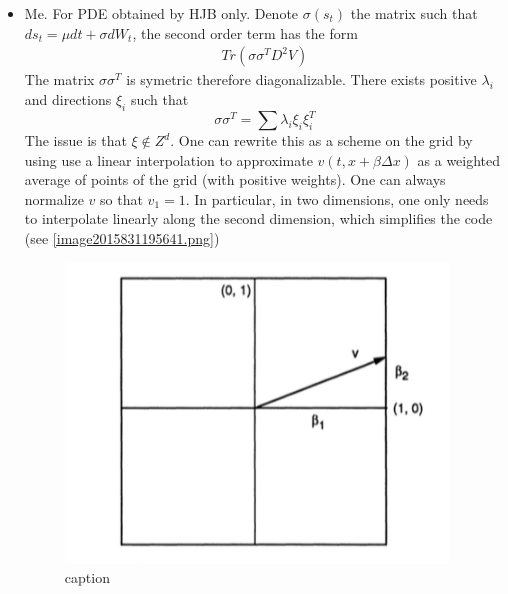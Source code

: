 \documentclass[english]{article}
\begin{document}
\begin{itemize}
\begin{itemize}
\begin{itemize}
			\item Me. For PDE obtained by HJB only. Denote $\sigma(s_t)$ the matrix such that $ds_t = \mu dt + \sigma dW_t$, the second order term has the form 
			\begin{align*}
				Tr(\sigma\sigma^TD^2V)
			\end{align*}
			The matrix $\sigma\sigma^T$ is symetric therefore diagonalizable. There exists positive $\lambda_i$ and directions $\xi_i$ such that
			$$\sigma\sigma^T = \sum \lambda_i \xi_i \xi_i^T$$ 
			The issue is that $\xi \notin Z^d$. One can rewrite this as a scheme on the grid by using use a linear interpolation to approximate $v(t, x+\beta \Delta x) $ as a weighted average of points of the grid (with positive weights). 
			One can always normalize $v$ so that $v_1 = 1$. In particular, in two dimensions, one only needs to interpolate linearly along the second dimension, which simplifies the code (see \autoref{image2015831195641.png})
			\begin{figure}[htp]
				\centering
				\includegraphics[width=4in]{image2015831195641.png}
				\caption{\label{image2015831195641.png}caption}
			\end{figure}
		\end{itemize}
	\end{itemize}
\end{itemize}
\end{document}
